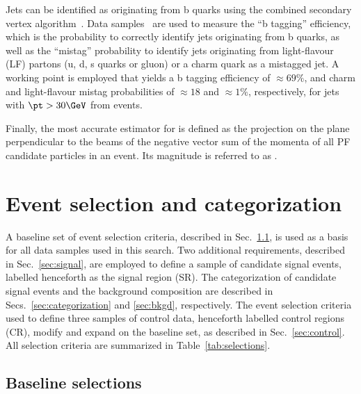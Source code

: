 Jets can be identified as originating from b quarks using the combined
secondary vertex algorithm~\cite{Chatrchyan:2012jua}. Data
samples~\cite{CMS-PAS-BTV-15-001} are used to measure the ``b
tagging'' efficiency, which is the probability to correctly identify
jets originating from b quarks, as well as the ``mistag'' probability
to identify jets originating from light-flavour (LF) partons (u, d, s
quarks or gluon) or a charm quark as a mistagged jet. A working point
is employed that yields a b tagging efficiency of ${\approx}69\%$, and
charm and light-flavour mistag probabilities of ${\approx}18$ and
${\approx}1\%$, respectively, for jets with $\pt > 30\GeV$ from \ttbar
events. 

Finally, the most accurate estimator for \ptvecmiss is defined as the
projection on the plane perpendicular to the beams of the negative
vector sum of the momenta of all PF candidate particles in an
event. Its magnitude is referred to as \ptmiss.


\section{Event selection and categorization}
\label{sec:selection}

A baseline set of event selection criteria, described in
Sec.~\ref{sec:baseline}, is used as a basis for all data samples used
in this search. Two additional requirements, described in
Sec.~\ref{sec:signal}, are employed to define a sample of candidate
signal events, labelled henceforth as the signal region (SR). The
categorization of candidate signal events and the background
composition are described in Secs.~\ref{sec:categorization} and
\ref{sec:bkgd}, respectively. The event selection criteria used to
define three samples of control data, henceforth labelled control
regions (CR), modify and expand on the baseline set, as described in
Sec.~\ref{sec:control}. All selection criteria are summarized in
Table~\ref{tab:selections}.

\subsection{Baseline selections}
\label{sec:baseline}


